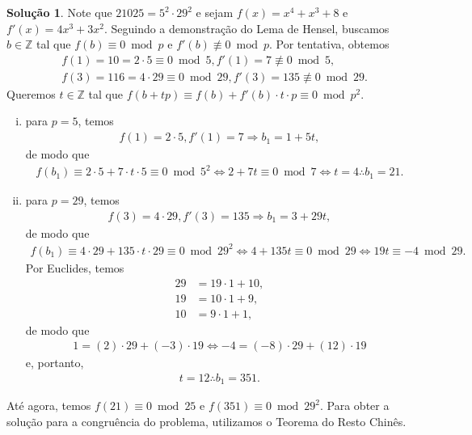 \documentclass[a4paper,11pt,twoside, leqno]{article}
\theoremstyle{definition}
\newtheorem*{solution}{Solução}
\begin{document}
\begin{solution}
	Note que $21025 = 5^2\cdot 29^2$ e sejam $f(x) = x^4 + x^3 + 8$ e $f'(x) = 4x^3 + 3x^2$. Seguindo a demonstração do Lema de Hensel, buscamos $b\in\mathbb{Z}$ tal que $f(b)\equiv 0\bmod p$ e $f'(b)\not\equiv 0\bmod p$. Por tentativa, obtemos
	\begin{align*}
	&f(1) = 10 = 2\cdot 5\equiv 0\bmod 5, f'(1) = 7\not\equiv 0\bmod 5, \\
	&f(3) = 116 = 4\cdot 29 \equiv 0\bmod 29, f'(3) = 135\not\equiv 0\bmod 29.
	\end{align*}
	Queremos $t\in\mathbb{Z}$ tal que $f(b + tp) \equiv f(b) + f'(b)\cdot t\cdot p\equiv 0\bmod p^2$.
	\begin{enumerate}[(i)]
		\item para $p=5$, temos
		\begin{align*}
		f(1) = 2\cdot 5, f'(1) = 7 \Rightarrow b_1 = 1+5t,
		\end{align*}
		de modo que
		\begin{align*}
		f(b_1) \equiv 2\cdot 5 + 7\cdot t\cdot 5 \equiv 0\bmod 5^2 \Leftrightarrow 2 + 7t\equiv 0\bmod 7 \Leftrightarrow t = 4 \therefore b_1 = 21.
		\end{align*}
		\item para $p = 29$, temos
		\begin{align*}
		f(3) = 4\cdot 29, f'(3) = 135 \Rightarrow b_1 = 3 + 29t,
		\end{align*}
		de modo que
		\begin{align*}
		f(b_1) \equiv 4\cdot 29 + 135\cdot t\cdot 29 \equiv 0\bmod 29^2 \Leftrightarrow 4 + 135t \equiv 0\bmod 29 \Leftrightarrow 19t\equiv -4\bmod 29.
		\end{align*}
		Por Euclides, temos
		\begin{align*}
		29 &= 19\cdot 1 + 10, \\
		19 &= 10\cdot 1 + 9, \\
		10 &= 9\cdot 1 + 1,
		\end{align*}
		de modo que
		\begin{align*}
		1 = (2)\cdot 29 + (-3)\cdot 19 \Leftrightarrow -4 = (-8)\cdot 29 + (12)\cdot 19
		\end{align*}
		e, portanto, 
		\begin{align*}
		t = 12\therefore b_1 = 351.
		\end{align*}
	\end{enumerate}
Até agora, temos $f(21)\equiv 0\bmod 25$ e $f(351)\equiv 0\bmod 29^2$. Para obter a solução para a congruência do problema, utilizamos o Teorema do Resto Chinês.

\end{solution}
\end{document}

